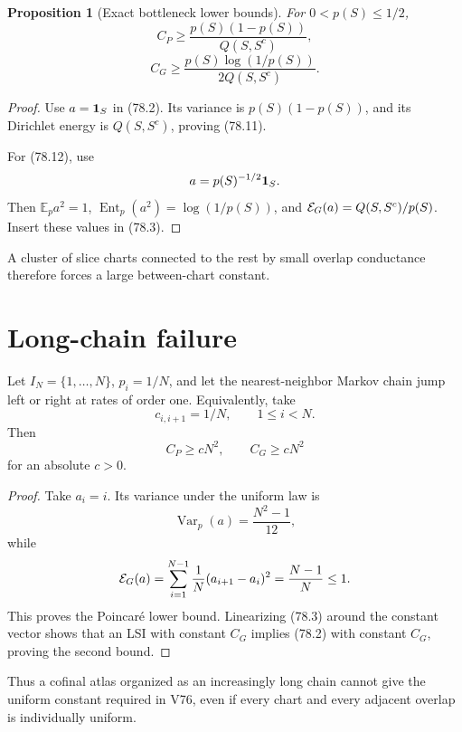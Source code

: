 \documentclass[11pt]{article}
\newtheorem{proposition}[theorem]{Proposition}
\theoremstyle{remark}
\begin{document}
\begin{proposition}[Exact bottleneck lower bounds]
\label{prop:v15v78-bottleneck}
For \(0<p(S)\leq1/2\),
\[
 C_P\geq
 \frac{p(S)(1-p(S))}{Q(S,S^c)},                       \tag{78.11}
\]
\[
 C_G\geq
 \frac{p(S)\log(1/p(S))}
 {2Q(S,S^c)}.                                         \tag{78.12}
\]
\end{proposition}

\begin{proof}
Use \(a={\bf1}_S\) in (78.2).  Its variance is
\(p(S)(1-p(S))\), and its Dirichlet energy is
\(Q(S,S^c)\), proving (78.11).

For (78.12), use
\[
 a=p(S)^{-1/2}{\bf1}_S.
\]
Then \(\mathbb E_pa^2=1\),
\(\operatorname{Ent}_p(a^2)=\log(1/p(S))\), and
\({\cal E}_G(a)=Q(S,S^c)/p(S)\).  Insert these values in
(78.3).
\end{proof}

A cluster of slice charts connected to the rest by small overlap
conductance therefore forces a large between-chart constant.

\section{Long-chain failure}

\begin{counterexample}
\label{cnt:v15v78-path}
Let \(I_N=\{1,\ldots,N\}\), \(p_i=1/N\), and let the nearest-neighbor
Markov chain jump left or right at rates of order one.  Equivalently,
take
\[
 c_{i,i+1}=1/N,\qquad1\leq i<N.                       \tag{78.13}
\]
Then
\[
 C_P\geq cN^2,\qquad C_G\geq cN^2                    \tag{78.14}
\]
for an absolute \(c>0\).
\end{counterexample}

\begin{proof}
Take \(a_i=i\).  Its variance under the uniform law is
\[
 \operatorname{Var}_p(a)=\frac{N^2-1}{12},
\]
while
\[
 {\cal E}_G(a)
 =
 \sum_{i=1}^{N-1}\frac1N(a_{i+1}-a_i)^2
 =
 \frac{N-1}{N}\leq1.
\]
This proves the Poincar\'e lower bound.  Linearizing (78.3) around
the constant vector shows that an LSI with constant \(C_G\)
implies (78.2) with constant \(C_G\), proving the second bound.
\end{proof}

Thus a cofinal atlas organized as an increasingly long chain cannot
give the uniform constant required in V76, even if every chart and
every adjacent overlap is individually uniform.
\end{document}
